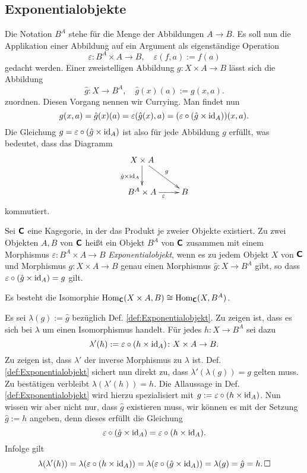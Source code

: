 \subsection{Exponentialobjekte}

Die Notation $B^A$ stehe für die Menge der Abbildungen $A\to B$.
Es soll nun die Applikation einer Abbildung auf ein Argument
als eigenständige Operation
\[\varepsilon\colon B^A\times A \to B,\quad
\varepsilon(f,a) := f(a)\]
gedacht werden. Einer zweistelligen Abbildung
$g\colon X\times A\to B$ lässt sich die Abbildung
\[\hat g\colon X\to B^A,\quad \hat g(x)(a) := g(x,a).\]
zuordnen. Diesen Vorgang nennen wir Currying. Man findet nun
\[g(x,a) = \hat g(x)(a) = \varepsilon(\hat g(x),a)
= (\varepsilon\circ (\hat g\times\operatorname{id}_A))(x,a).\]
Die Gleichung $g = \varepsilon\circ(\hat g\times\operatorname{id}_A)$ ist also
für jede Abbildung $g$ erfüllt, was bedeutet, dass das Diagramm
\[\xymatrix{
X\times A\ar[dr]^g\ar[d]_{\hat g\times\id_A} & \\
B^A\times A \ar[r]_{\varepsilon} & B
}\]
kommutiert.

\begin{Definition}[Exponentialobjekt]%
\label{def:Exponentialobjekt}\newlinefirst
Sei $\textsf{\textbf{C}}$ eine Kagegorie, in der das Produkt je zweier Objekte
existiert. Zu zwei Objekten $A,B$ von $\textsf{\textbf{C}}$ heißt ein
Objekt $B^A$ von $\textsf{\textbf{C}}$ zusammen mit einem Morphismus
$\varepsilon\colon B^A\times A\to B$ \emph{Exponentialobjekt},
wenn es zu jedem Objekt $X$ von $\textsf{\textbf{C}}$ und Morphismus
$g\colon X\times A\to B$ genau einen Morphismus $\hat g\colon X\to B^A$
gibt, so dass $\varepsilon\circ (\hat g\times\operatorname{id}_A) = g$ gilt.
\end{Definition}

\begin{Satz}\label{Exp-Isomorphie}
Es besteht die Isomorphie
$\operatorname{Hom}_{\textsf{\textbf{C}}}(X\times A, B)\cong\operatorname{Hom}_{\textsf{\textbf{C}}}(X,B^A)$.
\end{Satz}

\noindent{} Es sei $\lambda(g):=\hat g$ bezüglich Def.
\ref{def:Exponentialobjekt}. Zu zeigen ist, dass es sich bei $\lambda$
um einen Isomorphismus handelt. Für jedes $h\colon X\to B^A$ sei dazu
\[\lambda'(h) := \varepsilon\circ (h\times\operatorname{id}_{A})\colon X\times A\to B.\]
Zu zeigen ist, dass $\lambda'$ der inverse Morphismus zu $\lambda$ ist.
Def. \ref{def:Exponentialobjekt} sichert nun direkt zu, dass
$\lambda'(\lambda(g)) = g$ gelten muss. Zu bestätigen verbleibt
$\lambda(\lambda'(h)) = h$. Die Allaussage in Def. \ref{def:Exponentialobjekt}
wird hierzu spezialisiert mit $g:=\varepsilon\circ (h\times\operatorname{id}_A)$.
Nun wissen wir aber nicht nur, dass $\hat g$ existieren muss, wir
können es mit der Setzung $\hat g:=h$ angeben, denn dieses erfüllt die
Gleichung
\[\varepsilon\circ (\hat g\times\operatorname{id}_A) = \varepsilon\circ (h\times\operatorname{id}_A).\]
Infolge gilt
\[\lambda(\lambda'(h)) = \lambda(\varepsilon\circ (h\times\operatorname{id}_A))
= \lambda(\varepsilon\circ (\hat g\times\operatorname{id}_A))
= \lambda(g) = \hat g = h.\,\Box\]

